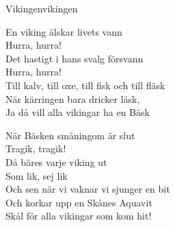 \begin{song}{Vikingen}{vikingen}
\begin{vers}
En viking älskar livets vann\\
Hurra, hurra!\\
Det hastigt i hans svalg försvann\\
Hurra, hurra!\\
Till kalv, till oxe, till fisk och till fläsk\\
När kärringen bara dricker läsk,   \\
Ja då vill alla vikingar ha en Bäsk\\
\end{vers}
\begin{vers}
När Bäsken småningom är slut\\
Tragik, tragik! \\
Då bäres varje viking ut\\
Som lik, sej lik\\
Och sen när vi vaknar vi sjunger en bit\\
Och korkar upp en Skånes Aquavit\\
Skål för alla vikingar som kom hit!\\
\end{vers}
\end{song}
